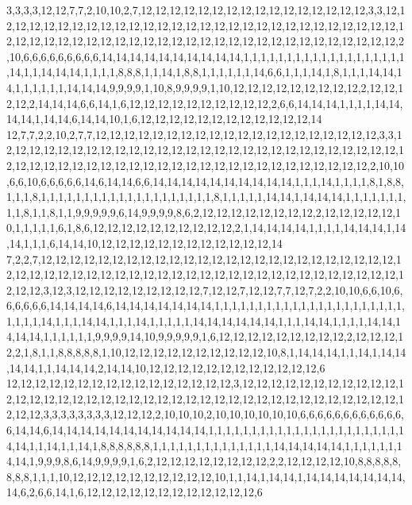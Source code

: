 3,3,3,3,12,12,7,7,2,10,10,2,7,12,12,12,12,12,12,12,12,12,12,12,12,12,12,12,12,3,3,12,12,12,12,12,12,12,12,12,12,12,12,12,12,12,12,12,12,12,12,12,12,12,12,12,12,12,12,12,12,12,12,12,12,12,12,12,12,12,12,12,12,12,12,12,12,12,12,12,12,12,12,12,12,12,12,12,2,10,6,6,6,6,6,6,6,6,6,14,14,14,14,14,14,14,14,14,14,1,1,1,1,1,1,1,1,1,1,1,1,1,1,1,1,1,1,1,14,1,1,14,14,14,1,1,1,1,8,8,8,1,1,14,1,8,8,1,1,1,1,1,1,14,6,6,1,1,1,14,1,8,1,1,1,14,14,14,1,1,1,1,1,1,14,14,14,9,9,9,9,1,10,8,9,9,9,9,1,10,12,12,12,12,12,12,12,12,12,2,12,12,12,12,2,14,14,14,6,6,14,1,6,12,12,12,12,12,12,12,12,12,12,2,6,6,14,14,14,1,1,1,1,14,14,14,14,1,14,14,6,14,14,10,1,6,12,12,12,12,12,12,12,12,12,12,12,12,14
12,7,7,2,2,10,2,7,7,12,12,12,12,12,12,12,12,12,12,12,12,12,12,12,12,12,12,12,12,3,3,12,12,12,12,12,12,12,12,12,12,12,12,12,12,12,12,12,12,12,12,12,12,12,12,12,12,12,12,12,12,12,12,12,12,12,12,12,12,12,12,12,12,12,12,12,12,12,12,12,12,12,12,12,12,2,10,10,6,6,10,6,6,6,6,6,14,6,14,14,6,6,14,14,14,14,14,14,14,14,14,14,1,1,1,14,1,1,1,1,8,1,8,8,1,1,1,8,1,1,1,1,1,1,1,1,1,1,1,1,1,1,1,1,1,1,1,1,8,1,1,1,1,1,14,14,1,14,14,14,1,1,1,1,1,1,1,1,1,8,1,1,8,1,1,9,9,9,9,9,6,14,9,9,9,9,8,6,2,12,12,12,12,12,12,12,12,2,12,12,12,12,12,10,1,1,1,1,1,6,1,8,6,12,12,12,12,12,12,12,12,12,12,2,1,14,14,14,14,1,1,1,1,14,14,14,1,14,14,1,1,1,6,14,14,10,12,12,12,12,12,12,12,12,12,12,12,12,14
7,2,2,7,12,12,12,12,12,12,12,12,12,12,12,12,12,12,12,12,12,12,12,12,12,12,12,12,12,12,12,12,12,12,12,12,12,12,12,12,12,12,12,12,12,12,12,12,12,12,12,12,12,12,12,12,12,12,12,12,3,12,3,12,12,12,12,12,12,12,12,12,7,12,12,7,12,12,7,7,12,7,2,2,10,10,6,6,10,6,6,6,6,6,6,14,14,14,14,6,14,14,14,14,14,14,14,1,1,1,1,1,1,1,1,1,1,1,1,1,1,1,1,1,1,1,1,1,1,1,1,1,1,14,1,1,1,14,14,1,1,1,14,1,1,1,1,1,14,14,14,14,14,14,1,1,1,14,14,1,1,1,1,14,14,14,14,14,1,1,1,1,1,1,9,9,9,9,14,10,9,9,9,9,9,1,6,12,12,12,12,12,12,12,12,12,2,12,12,12,12,2,1,8,1,1,8,8,8,8,8,1,10,12,12,12,12,12,12,12,12,12,12,10,8,1,14,14,14,1,1,14,1,14,14,14,14,1,1,14,14,14,2,14,14,10,12,12,12,12,12,12,12,12,12,12,12,12,6
12,12,12,12,12,12,12,12,12,12,12,12,12,12,12,12,3,12,12,12,12,12,12,12,12,12,12,12,12,12,12,12,12,12,12,12,12,12,12,12,12,12,12,12,12,12,12,12,12,12,12,12,12,12,12,12,12,12,12,3,3,3,3,3,3,3,3,12,12,12,2,10,10,10,2,10,10,10,10,10,10,6,6,6,6,6,6,6,6,6,6,6,6,6,14,14,6,14,14,14,14,14,14,14,14,14,14,14,1,1,1,1,1,1,1,1,1,1,1,1,1,1,1,1,1,1,1,1,1,1,14,14,1,1,14,1,1,14,1,8,8,8,8,8,8,1,1,1,1,1,1,1,1,1,1,1,1,1,1,14,14,14,14,14,1,1,1,1,1,1,14,14,1,9,9,9,8,6,14,9,9,9,9,1,6,2,12,12,12,12,12,12,12,12,2,2,12,12,12,12,10,8,8,8,8,8,8,8,8,1,1,1,10,12,12,12,12,12,12,12,12,12,12,10,1,1,14,1,14,14,1,14,14,14,14,14,14,14,14,6,2,6,6,14,1,6,12,12,12,12,12,12,12,12,12,12,12,12,6
